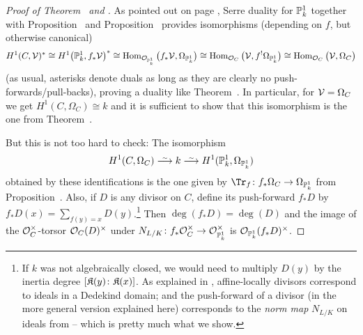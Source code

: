 \documentclass[a4paper,parskip=half,numbers=enddot, DIV=12]{scrreprt}
\begin{document}
\begin{proof}[Proof of Theorem~ and ]
	As pointed out on page \pageref{par:StrategyForSD}, Serre duality for $\mathbb{P}_k^1$ together with Proposition~ and Proposition~ provides isomorphisms (depending on $f$, but otherwise canonical)
	\begin{align*}
	H^1(C,\mathcal{V})^*\cong H^1\big(\mathbb{P}_k^1,f_*\mathcal{V}\big)^*\cong \operatorname{Hom}_{\mathcal{O}_{\mathbb{P}_k^1}}\big(f_*\mathcal{V},\Omega_{\mathbb{P}_k^1}\big)\cong \operatorname{Hom}_{\mathcal{O}_C}\big(\mathcal{V},f^!\Omega_{\mathbb{P}_k^1}\big)\cong \operatorname{Hom}_{\mathcal{O}_C}\big(\mathcal{V},\Omega_C\big)
	\end{align*}
	(as usual, asterisks denote duals as long as they are clearly no push-forwards/pull-backs), proving a duality like Theorem~. In particular, for $\mathcal{V}=\Omega_C$ we get $H^1(C,\Omega_C)\cong k$ and it is sufficient to show that this isomorphism is the one from Theorem~. 

	But this is not too hard to check: The isomorphism 
	\begin{align*}
	H^1(C,\Omega_C)\isomorphism k\isomorphism H^1(\IP_k^1,\Omega_{\IP_k^1})
	\end{align*}
	obtained by these identifications is the one given by $\Tr_f\colon f_*\Omega_C\morphism\Omega_{\IP_k^1}$ from Proposition~. Also, if $D$ is any divisor on $C$, define its push-forward $f_*D$ by $f_*D(x)=\sum_{f(y)=x}D(y)$.\footnote{If $k$ was not algebraically closed, we would need to multiply $D(y)$ by the inertia degree $[\mathfrak{K}(y)\colon \mathfrak{K}(x)]$. As explained in \cite[Ch.\ I, \S 12]{NEUKIRCH}, affine-locally divisors correspond to ideals in a Dedekind domain; and the push-forward of a divisor (in the more general version explained here) corresponds to the \emph{norm map} $N_{L/K}$ on ideals from \cite[p.\ 197]{NEUKIRCH} -- which is pretty much what we show.} Then $\deg(f_*D)=\deg(D)$ and the image of the $\mathcal{O}_C^\times$-torsor $\mathcal{O}_C(D)^\times$ under $N_{L/K}\colon f_*\Oo_C^\times\morphism\Oo_{\IP_k^1}^\times$ is $\mathcal{O}_{\mathbb{P}_k^1}(f_*D)^\times$.
\end{proof}
\end{document}
